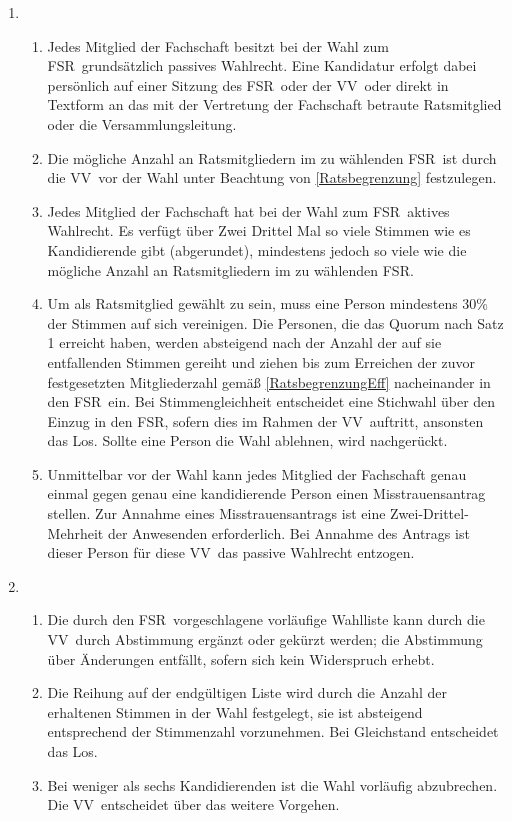 \documentclass[a4paper, 12pt]{article}
\newcommand{\vv}{VV}
\newcommand{\rat}{FSR}
\newcommand{\rates}{FSR}
\begin{document}
\begin{enumerate}[leftmargin=0cm]
	\item {}
	\begin{enumerate}[leftmargin=0cm]
		\item Jedes Mitglied der Fachschaft besitzt bei der Wahl zum \rat~grundsätzlich passives Wahlrecht. Eine Kandidatur erfolgt dabei
		persönlich auf einer Sitzung des \rates~oder der \vv~oder
		direkt in Textform an das mit der Vertretung der Fachschaft betraute Ratsmitglied oder die Versammlungsleitung.
		\item Die mögliche Anzahl an Ratsmitgliedern im zu wählenden \rat~ist durch die \vv~vor der Wahl unter Beachtung von \cref{Ratsbegrenzung} festzulegen. \label{RatsbegrenzungEff}
		\item Jedes Mitglied der Fachschaft hat bei der Wahl zum \rat~aktives Wahlrecht. Es verfügt über Zwei Drittel Mal so viele Stimmen wie es Kandidierende gibt (abgerundet), mindestens jedoch so viele wie die mögliche Anzahl an Ratsmitgliedern im zu wählenden \rat.
		\item Um als Ratsmitglied gewählt zu sein, muss eine Person mindestens 30\% der Stimmen auf sich vereinigen. Die Personen, die das Quorum nach Satz 1 erreicht haben, werden absteigend nach der Anzahl der auf sie entfallenden Stimmen gereiht und ziehen bis zum Erreichen der zuvor festgesetzten Mitgliederzahl gemäß \cref{RatsbegrenzungEff} nacheinander in den \rat~ein. Bei Stimmengleichheit entscheidet eine Stichwahl über den Einzug in den \rat, sofern dies im Rahmen der \vv~auftritt, ansonsten das Los. Sollte eine Person die Wahl ablehnen, wird nachgerückt. 
		\item Unmittelbar vor der Wahl kann jedes Mitglied der Fachschaft genau einmal gegen genau eine kandidierende Person einen Misstrauensantrag stellen. Zur Annahme eines Misstrauensantrags ist eine Zwei-Drittel-Mehrheit der Anwesenden erforderlich. Bei Annahme des Antrags ist dieser Person für diese \vv~das passive Wahlrecht entzogen.
	\end{enumerate}
	
	\newpage
	
	\item {}
	\begin{enumerate}[leftmargin=0cm]
		\item Die durch den \rat~vorgeschlagene vorläufige Wahlliste kann durch die \vv~durch Abstimmung ergänzt oder gekürzt werden; die Abstimmung über Änderungen entfällt, sofern sich kein Widerspruch erhebt.
		\item Die Reihung auf der endgültigen Liste wird durch die Anzahl der erhaltenen Stimmen in der Wahl festgelegt, sie ist absteigend entsprechend der Stimmenzahl vorzunehmen. Bei Gleichstand entscheidet das Los.
		\item Bei weniger als sechs Kandidierenden ist die Wahl vorläufig abzubrechen. Die \vv~entscheidet über das weitere Vorgehen.
	\end{enumerate}


\end{enumerate}
\end{document}
